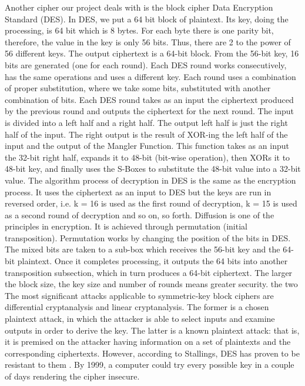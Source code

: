 Another cipher our project deals with is the block cipher Data Encryption Standard (DES). In DES, we put a 64 bit block of plaintext. Its key, doing the processing, is 64 bit which is 8 bytes. For each byte there is one parity bit, therefore, the value in the key is only 56 bits. Thus, there are 2 to the power of 56 different keys. The output ciphertext is a 64-bit block. 
From the 56-bit key, 16 bits are generated (one for each round). Each DES round works consecutively, has the same operations and uses a different key. Each round uses a combination of proper substitution, where we take some bits, substituted with another combination of bits. Each DES round takes as an input the ciphertext produced by the previous round and outputs the ciphertext for the next round. The input is divided into a left half and a right half. The output left half is just the right half of the input. The right output is the result of XOR-ing the left half of the input and the output of the Mangler Function. This function takes as an input the 32-bit right half, expands it to 48-bit (bit-wise operation), then XORs it to 48-bit key, and finally uses the S-Boxes to substitute the 48-bit value into a 32-bit value.
The algorithm process of decryption in DES is the same as the encryption process. It uses the ciphertext as an input to DES but the keys are run in reversed order, i.e. k = 16 is used as the first round of decryption, k = 15 is used as a second round of decryption and so on, so forth. 
Diffusion is one of the principles in encryption. It is achieved through permutation (initial transposition). Permutation works by changing the position of the bits in DES. The mixed bits are taken to a sub-box which receives the 56-bit key and the 64-bit plaintext. Once it completes processing, it outputs the 64 bits into another transposition subsection, which in turn produces a 64-bit ciphertext. 
The larger the block size, the key size and number of rounds means greater security. the two The most significant attacks applicable to symmetric-key block ciphers are differential cryptanalysis and linear cryptanalysis. The former is a chosen plaintext attack, in which the attacker is able to select inputs and examine outputs in order to derive the key. The latter is a known plaintext attack: that is, it is premised on the attacker having information on a set of plaintexts and the corresponding ciphertexts. However, according to Stallings, DES has proven to be resistant to them \cite{stallings2011-a}. By 1999, a computer could try every possible key in a couple of days rendering the cipher insecure.


